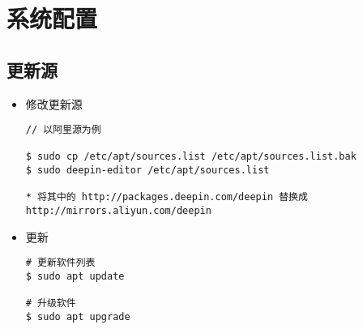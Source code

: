\chapter{系统配置}
\section{更新源}

\begin{itemize}
\item 修改更新源
\begin{lstlisting}
// 以阿里源为例
  
$ sudo cp /etc/apt/sources.list /etc/apt/sources.list.bak  
$ sudo deepin-editor /etc/apt/sources.list

* 将其中的 http://packages.deepin.com/deepin 替换成 http://mirrors.aliyun.com/deepin 
\end{lstlisting}

\item 更新
\begin{lstlisting}
# 更新软件列表
$ sudo apt update  

# 升级软件 
$ sudo apt upgrade 
\end{lstlisting}
\end{itemize}